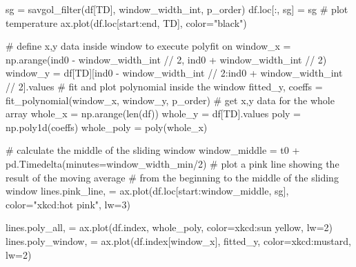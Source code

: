 \documentclass[
  letterpaper,
  DIV=11,
  numbers=noendperiod,
  oneside]{scrreprt}
\newenvironment{Shaded}{\begin{snugshade}}{\end{snugshade}}
\newcommand{\BuiltInTok}[1]{\textcolor[rgb]{0.00,0.23,0.31}{#1}}
\newcommand{\CommentTok}[1]{\textcolor[rgb]{0.37,0.37,0.37}{#1}}
\newcommand{\DecValTok}[1]{\textcolor[rgb]{0.68,0.00,0.00}{#1}}
\newcommand{\NormalTok}[1]{\textcolor[rgb]{0.00,0.23,0.31}{#1}}
\newcommand{\OperatorTok}[1]{\textcolor[rgb]{0.37,0.37,0.37}{#1}}
\newcommand{\StringTok}[1]{\textcolor[rgb]{0.13,0.47,0.30}{#1}}
\begin{document}
\begin{Shaded}
\begin{Highlighting}[]
\NormalTok{sg }\OperatorTok{=}\NormalTok{ savgol\_filter(df[}\StringTok{\textquotesingle{}TD\textquotesingle{}}\NormalTok{], window\_width\_int, p\_order)}
\NormalTok{df.loc[:, }\StringTok{\textquotesingle{}sg\textquotesingle{}}\NormalTok{] }\OperatorTok{=}\NormalTok{ sg }
\CommentTok{\# plot temperature}
\NormalTok{ax.plot(df.loc[start:end, }\StringTok{\textquotesingle{}TD\textquotesingle{}}\NormalTok{], color}\OperatorTok{=}\StringTok{"black"}\NormalTok{)}

\CommentTok{\# define x,y data inside window to execute polyfit on}
\NormalTok{window\_x }\OperatorTok{=}\NormalTok{ np.arange(ind0 }\OperatorTok{{-}}\NormalTok{ window\_width\_int }\OperatorTok{//} \DecValTok{2}\NormalTok{, ind0 }\OperatorTok{+}\NormalTok{ window\_width\_int }\OperatorTok{//} \DecValTok{2}\NormalTok{)}
\NormalTok{window\_y }\OperatorTok{=}\NormalTok{ df[}\StringTok{\textquotesingle{}TD\textquotesingle{}}\NormalTok{][ind0 }\OperatorTok{{-}}\NormalTok{ window\_width\_int }\OperatorTok{//} \DecValTok{2}\NormalTok{:ind0 }\OperatorTok{+}\NormalTok{ window\_width\_int }\OperatorTok{//} \DecValTok{2}\NormalTok{].values}
\CommentTok{\# fit and plot polynomial inside the window}
\NormalTok{fitted\_y, coeffs }\OperatorTok{=}\NormalTok{ fit\_polynomial(window\_x, window\_y, p\_order)}
\CommentTok{\# get x,y data for the whole array}
\NormalTok{whole\_x }\OperatorTok{=}\NormalTok{ np.arange(}\BuiltInTok{len}\NormalTok{(df))}
\NormalTok{whole\_y }\OperatorTok{=}\NormalTok{ df[}\StringTok{\textquotesingle{}TD\textquotesingle{}}\NormalTok{].values}
\NormalTok{poly }\OperatorTok{=}\NormalTok{ np.poly1d(coeffs)}
\NormalTok{whole\_poly }\OperatorTok{=}\NormalTok{ poly(whole\_x)}

\CommentTok{\# calculate the middle of the sliding window}
\NormalTok{window\_middle }\OperatorTok{=}\NormalTok{ t0 }\OperatorTok{+}\NormalTok{ pd.Timedelta(minutes}\OperatorTok{=}\NormalTok{window\_width\_min}\OperatorTok{/}\DecValTok{2}\NormalTok{)}
\CommentTok{\# plot a pink line showing the result of the moving average}
\CommentTok{\# from the beginning to the middle of the sliding window}
\NormalTok{lines.pink\_line, }\OperatorTok{=}\NormalTok{ ax.plot(df.loc[start:window\_middle, }\StringTok{\textquotesingle{}sg\textquotesingle{}}\NormalTok{], color}\OperatorTok{=}\StringTok{"xkcd:hot pink"}\NormalTok{, lw}\OperatorTok{=}\DecValTok{3}\NormalTok{)}

\NormalTok{lines.poly\_all, }\OperatorTok{=}\NormalTok{ ax.plot(df.index, whole\_poly, color}\OperatorTok{=}\StringTok{\textquotesingle{}xkcd:sun yellow\textquotesingle{}}\NormalTok{, lw}\OperatorTok{=}\DecValTok{2}\NormalTok{)}
\NormalTok{lines.poly\_window, }\OperatorTok{=}\NormalTok{ ax.plot(df.index[window\_x], fitted\_y, color}\OperatorTok{=}\StringTok{\textquotesingle{}xkcd:mustard\textquotesingle{}}\NormalTok{, lw}\OperatorTok{=}\DecValTok{2}\NormalTok{)}


\end{Highlighting}
\end{Shaded}
\end{document}

